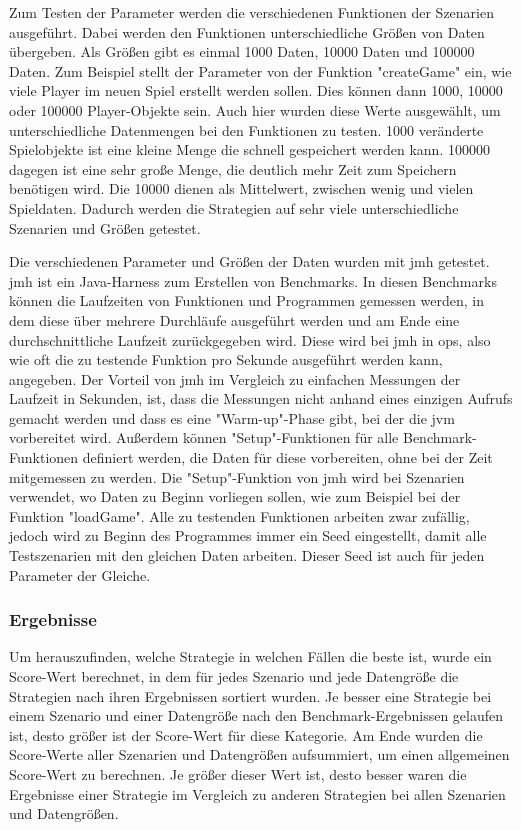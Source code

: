 Zum Testen der Parameter werden die verschiedenen Funktionen der Szenarien ausgeführt. Dabei werden den Funktionen unterschiedliche Größen von Daten übergeben. Als Größen gibt es einmal 1000 Daten, 10000 Daten und 100000 Daten. Zum Beispiel stellt der Parameter von der Funktion "createGame" ein, wie viele Player im neuen Spiel erstellt werden sollen. Dies können dann 1000, 10000 oder 100000 Player-Objekte sein. Auch hier wurden diese Werte ausgewählt, um unterschiedliche Datenmengen bei den Funktionen zu testen. 1000 veränderte Spielobjekte ist eine kleine Menge die schnell gespeichert werden kann. 100000 dagegen ist eine sehr große Menge, die deutlich mehr Zeit zum Speichern benötigen wird. Die 10000 dienen als Mittelwert, zwischen wenig und vielen Spieldaten. Dadurch werden die Strategien auf sehr viele unterschiedliche Szenarien und Größen getestet.

Die verschiedenen Parameter und Größen der Daten wurden mit \ac{jmh} getestet.\cite{githubGitHubOpenjdkjmh} \ac{jmh} ist ein Java-Harness zum Erstellen von Benchmarks. In diesen Benchmarks können die Laufzeiten von Funktionen und Programmen gemessen werden, in dem diese über mehrere Durchläufe ausgeführt werden und am Ende eine durchschnittliche Laufzeit zurückgegeben wird. Diese wird bei \ac{jmh} in \ac{ops}, also wie oft die zu testende Funktion pro Sekunde ausgeführt werden kann, angegeben.\cite{githubGitHubOpenjdkjmh} Der Vorteil von \ac{jmh} im Vergleich zu einfachen Messungen der Laufzeit in Sekunden, ist, dass die Messungen nicht anhand eines einzigen Aufrufs gemacht werden und dass es eine "Warm-up"-Phase gibt, bei der die \ac{jvm} vorbereitet wird. Außerdem können "Setup"-Funktionen für alle Benchmark-Funktionen definiert werden, die Daten für diese vorbereiten, ohne bei der Zeit mitgemessen zu werden. Die "Setup"-Funktion von \ac{jmh} wird bei Szenarien verwendet, wo Daten zu Beginn vorliegen sollen, wie zum Beispiel bei der Funktion "loadGame". Alle zu testenden Funktionen arbeiten zwar zufällig, jedoch wird zu Beginn des Programmes immer ein Seed eingestellt, damit alle Testszenarien mit den gleichen Daten arbeiten. Dieser Seed ist auch für jeden Parameter der Gleiche.

\subsubsection{Ergebnisse}
Um herauszufinden, welche Strategie in welchen Fällen die beste ist, wurde ein Score-Wert berechnet, in dem für jedes Szenario und jede Datengröße die Strategien nach ihren Ergebnissen sortiert wurden. Je besser eine Strategie bei einem Szenario und einer Datengröße nach den Benchmark-Ergebnissen gelaufen ist, desto größer ist der Score-Wert für diese Kategorie. Am Ende wurden die Score-Werte aller Szenarien und Datengrößen aufsummiert, um einen allgemeinen Score-Wert zu berechnen. Je größer dieser Wert ist, desto besser waren die Ergebnisse einer Strategie im Vergleich zu anderen Strategien bei allen Szenarien und Datengrößen. 

